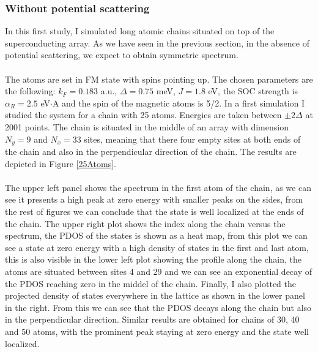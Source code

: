 \documentclass[letterpaper,12pt]{article}
\begin{document}
\subsubsection{Without potential scattering}

In this first study, I simulated long atomic chains situated on top of the superconducting array. As we have seen in the previous section, in the absence of potential scattering, we expect to obtain symmetric spectrum.\\ \\
The atoms are set in FM state with spins pointing up. The chosen parameters are the following: $k_F = 0.183$ a.u., $\Delta = 0.75$ meV, $J = 1.8$ eV, the SOC strength is $\alpha_R = 2.5$ eV$\cdot$A and the spin of the magnetic atoms is 5/2. In a first simulation I studied the system for a chain with 25 atoms. Energies are taken between $\pm 2\Delta$ at 2001 points. The chain is situated in the middle of an array with dimension $N_y = 9$ and $N_x = 33$ sites, meaning that there four empty sites at both ends of the chain and also in the perpendicular direction of the chain. The results are depicted in Figure \ref{25Atoms}.\\ \\ 
The upper left panel shows the spectrum in the first atom of the chain, as we can see it presents a high peak at zero energy with smaller peaks on the sides, from the rest of figures we can conclude that the state is well localized at the ends of the chain. The upper right plot shows the index along the chain versus the spectrum, the PDOS of the states is shown as a heat map, from this plot we can see a state at zero energy with a high density of states in the first and last atom, this is also visible in the lower left plot showing the profile along the chain, the atoms are situated between sites 4 and 29 and we can see an exponential decay of the PDOS reaching zero in the middel of the chain. Finally, I also plotted the projected density of states everywhere in the lattice as shown in the lower panel in the right. From this we can see that the PDOS decays along the chain but also in the perpendicular direction. Similar results are obtained for chains of 30, 40 and 50 atoms, with the prominent peak staying at zero energy and the state well localized.\\ \\
\end{document}
